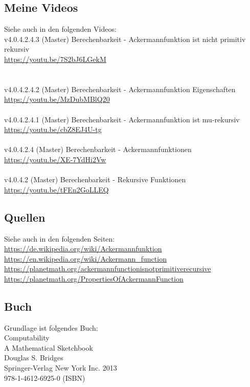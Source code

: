 \documentclass[a4paper]{amsart}
\theoremstyle{definition}
\begin{document}
\subsection*{Meine Videos}
Siehe auch in den folgenden Videos:\\
v4.0.4.2.4.3 (Master) Berechenbarkeit - Ackermannfunktion ist nicht primitiv rekursiv\\
 \url{https://youtu.be/7S2bJ6LGekM}\\
 \\
\\v4.0.4.2.4.2 (Master) Berechenbarkeit - Ackermannfunktion Eigenschaften\\
 \url{https://youtu.be/MzDubMBlQ20}\\
 \\
v4.0.4.2.4.1 (Master) Berechenbarkeit - Ackermannfunktion ist mu-rekursiv\\
 \url{https://youtu.be/cbZ8EJ4U-tg}\\
 \\
v4.0.4.2.4 (Master) Berechenbarkeit - Ackermannfunktionen\\
 \url{https://youtu.be/XE-7YdHi2Vw}\\
 \\
v4.0.4.2 (Master) Berechenbarkeit - Rekursive Funktionen\\
 \url{https://youtu.be/tFEn2GoLLEQ}

\subsection*{Quellen}
Siehe auch in den folgenden Seiten:\\
\url{https://de.wikipedia.org/wiki/Ackermannfunktion}\\
\url{https://en.wikipedia.org/wiki/Ackermann\_function}\\
\url{https://planetmath.org/ackermannfunctionisnotprimitiverecursive}\\
\url{https://planetmath.org/PropertiesOfAckermannFunction}

\subsection*{Buch}
Grundlage ist folgendes Buch:\\
Computability\\
A Mathematical Sketchbook\\
Douglas S. Bridges\\
Springer-Verlag New York Inc. 2013\\
978-1-4612-6925-0 (ISBN)
\end{document}
